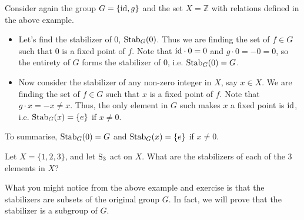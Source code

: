 \begin{example}
    Consider again the group $G = \{\mathrm{id}, g\}$ and the set $X = \mathbb{Z}$ with relations defined in the above example.
    \begin{itemize}
        \item Let's find the stabilizer of 0, $\mathrm{Stab}_{G}(0)$. Thus we are finding the set of $f \in G$ such that 0 is a fixed point of $f$. Note that $\mathrm{id} \cdot 0 = 0$ and $g \cdot 0 = -0 = 0$, so the entirety of $G$ forms the stabilizer of 0, i.e. $\mathrm{Stab}_{G}(0) = G$.
        \item Now consider the stabilizer of any non-zero integer in $X$, say $x \in X$. We are finding the set of $f \in G$ such that $x$ is a fixed point of $f$. Note that $g \cdot x = -x \neq x$. Thus, the only element in $G$ such makes $x$ a fixed point is $\mathrm{id}$, i.e. $\mathrm{Stab}_{G}(x) = \{e\}$ if $x \neq 0$.
    \end{itemize}
    To summarise, $\mathrm{Stab}_{G}(0) = G$ and $\mathrm{Stab}_{G}(x) = \{e\}$ if $x \neq 0$.
\end{example}

\begin{exercise}
    Let $X = \{1, 2, 3\}$, and let $\mathrm{S}_{3}$ act on $X$. What are the stabilizers of each of the 3 elements in $X$?
\end{exercise}

What you might notice from the above example and exercise is that the stabilizers are subsets of the original group $G$. In fact, we will prove that the stabilizer is a subgroup of $G$.


